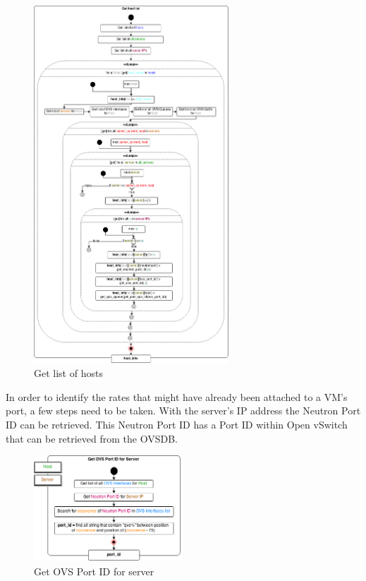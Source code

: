 \begin{figure}[H]
\centering

\includegraphics[width=0.65\textwidth]{images/implementation/cma_host_list}

\caption{Get list of hosts}
\end{figure}

In order to identify the rates that might have already been attached to a VM's port, a few steps need to be taken. With the server's IP address the Neutron Port ID can be retrieved. This Neutron Port ID has a Port ID within Open vSwitch that can be retrieved from the OVSDB. 

\begin{figure}[H]
\centering

\includegraphics[width=0.5\textwidth]{images/implementation/cma_get_ovs_port_server}

\caption{Get OVS Port ID for server}
\end{figure}

